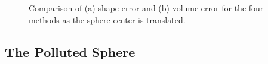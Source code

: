 \begin{figure}[b!]
	\centering
	\caption{Comparison of (a) shape error and (b) volume error for the four methods as the sphere center is translated.}
	\label{fig:graph3}
\end{figure}
\subsection{{The Polluted Sphere}}
\label{The Polluted Sphere}

